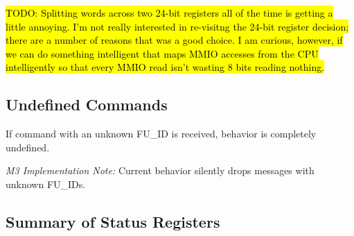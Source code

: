 \hl{TODO: Splitting words across two 24-bit registers all of the time is
  getting a little annoying. I'm not really interested in re-visitng the
  24-bit register decision; there are a number of reasons that was a good
  choice. I am curious, however, if we can do something intelligent that maps
  MMIO accesses from the CPU intelligently so that every MMIO read isn't
wasting 8 bits reading nothing.}

\subsection{Undefined Commands}
\label{cmd:undef}
If command with an unknown FU\_ID is received, \proto behavior is completely
undefined.

\medskip
\noindent
\emph{M3 Implementation Note:} Current behavior silently drops messages with
unknown FU\_IDs.

\newpage
\subsection{Summary of Status Registers}
\label{cmd:status-register-summary}

\recordRegWrite

\recordRegRead

\recordMemBulkWrite

\recordMemRead

\recordMemStreamWrite

\recordSnoop

